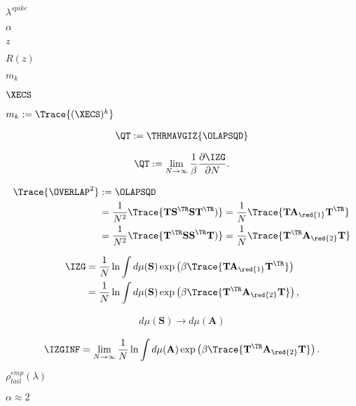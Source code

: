 $\lambda^{spike}$

$\alpha$

$z$

$R(z)$

$m_{k}$

$\XECS$

$m_{k}:=\Trace{(\XECS)^{k}}$

\begin{align}
  \label{eqn:QT}
  \QT :=   \THRMAVGIZ{\OLAPSQD}
\end{align}

\begin{align}
  \label{eqn:IZG_QT}
  \QT := \lim_{N\rightarrow\infty}\dfrac{1}{\beta}\dfrac{\partial\IZG }{\partial N}.
\end{align}

\begin{align}
  \label{eqn:R2}
\Trace{\OVERLAP^{2}} &:=\OLAPSQD  \\ \nonumber
&=\frac{1}{N^{2}}\Trace{\mathbf{T}\mathbf{S}^{\TR}\mathbf{S}\mathbf{T}^{\TR})}
=\frac{1}{N}\Trace{\mathbf{T}\mathbf{A}_\red{1}\mathbf{T}^{\TR}}  \\ \nonumber
&=\frac{1}{N^{2}}\Trace{\mathbf{T}^{\TR}\mathbf{SS}^{\TR}\mathbf{T})}
=\frac{1}{N}\Trace{\mathbf{T}^{\TR}\mathbf{A}_\red{2}\mathbf{T}}
\end{align}

\begin{align}
  \label{eqn:QT_dS}
  \IZG &=  \frac{1}{N}\ln\int d\mu(\mathbf{S})\exp\left(\beta\Trace{\mathbf{T}\mathbf{A}_\red{1}\mathbf{T}^{\TR}}\right) \\ \nonumber
  &=  \frac{1}{N}\ln\int d\mu(\mathbf{S})\exp\left(\beta\Trace{\mathbf{T}^{\TR}\mathbf{A}_\red{2}\mathbf{T}}\right),
\end{align}

\begin{align}
  \label{eqn:change_measure}
  d\mu(\mathbf{S})\rightarrow d\mu(\mathbf{A})
\end{align}

\begin{align}
  \label{eqn:IZGINF_HCIZ}
  \IZGINF = \lim_{N\rightarrow\infty}\frac{1}{N}\ln\int d\mu(\mathbf{A})\exp\left(\beta\Trace{\mathbf{T}^{\TR}\mathbf{A}_\red{2}\mathbf{T}}\right).
\end{align}


$\rho^{emp}_{tail}(\lambda)$

$\alpha\approx 2$

